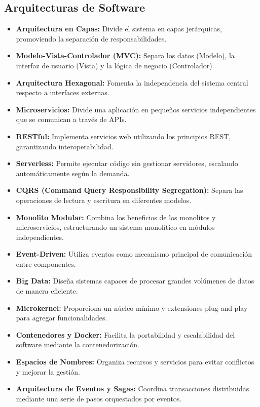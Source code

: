 \documentclass{article}
\begin{document}
\subsection{Arquitecturas de Software}

\begin{itemize}
    \item \textbf{Arquitectura en Capas:} Divide el sistema en capas jerárquicas, promoviendo la separación de responsabilidades.
    \item \textbf{Modelo-Vista-Controlador (MVC):} Separa los datos (Modelo), la interfaz de usuario (Vista) y la lógica de negocio (Controlador).
    \item \textbf{Arquitectura Hexagonal:} Fomenta la independencia del sistema central respecto a interfaces externas.
    \item \textbf{Microservicios:} Divide una aplicación en pequeños servicios independientes que se comunican a través de APIs.
    \item \textbf{RESTful:} Implementa servicios web utilizando los principios REST, garantizando interoperabilidad.
    \item \textbf{Serverless:} Permite ejecutar código sin gestionar servidores, escalando automáticamente según la demanda.
    \item \textbf{CQRS (Command Query Responsibility Segregation):} Separa las operaciones de lectura y escritura en diferentes modelos.
    \item \textbf{Monolito Modular:} Combina los beneficios de los monolitos y microservicios, estructurando un sistema monolítico en módulos independientes.
    \item \textbf{Event-Driven:} Utiliza eventos como mecanismo principal de comunicación entre componentes.
    \item \textbf{Big Data:} Diseña sistemas capaces de procesar grandes volúmenes de datos de manera eficiente.
    \item \textbf{Microkernel:} Proporciona un núcleo mínimo y extensiones plug-and-play para agregar funcionalidades.
    \item \textbf{Contenedores y Docker:} Facilita la portabilidad y escalabilidad del software mediante la contenedorización.
    \item \textbf{Espacios de Nombres:} Organiza recursos y servicios para evitar conflictos y mejorar la gestión.
    \item \textbf{Arquitectura de Eventos y Sagas:} Coordina transacciones distribuidas mediante una serie de pasos orquestados por eventos.
\end{itemize}
\end{document}
